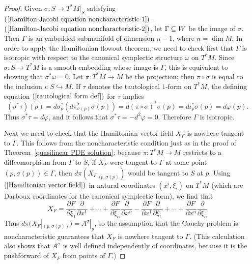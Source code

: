 \begin{proof}
Given $\sigma:S\to T^*M|_S$ satisfying $(\ref{Hamilton-Jacobi equation noncharacteristic-1})$--$(\ref{Hamilton-Jacobi equation noncharacteristic-2})$, let $\Gamma\subseteq W$ be the image of $\sigma$. Then $\Gamma$ is an embedded submanifold of dimension $n-1$, where $n=\dim M$. In order to apply the Hamiltonian flowout theorem, we need to check first that $\Gamma$ is isotropic with respect to the canonical symplectic structure $\omega$ on $T^*M$. Since $\sigma:S\to T^*M$ is a smooth embedding whose image is $\Gamma$, this is equivalent to showing that $\sigma^*\omega=0$. Let $\pi:T^*M\to M$ be the projection; then $\pi\circ\sigma$ is equal to the inclusion $\iota:S\hookrightarrow M$. If $\tau$ denotes the tautological $1$-form on $T^*M$, the defining equation $(\ref{tautological form def})$ for $\tau$ implies
\[(\sigma^*\tau)(p)=d\sigma_p^*(d\pi_{\sigma(p)}^*\sigma(p))=d(\pi\circ\sigma)^*\sigma(p)=d\iota_p^*\sigma(p)=d\varphi(p).\]
Thus $\sigma^*\tau=d\varphi$, and it follows that $\sigma^*\tau=-d^2\varphi=0$. Therefore $\Gamma$ is isotropic.\par
Next we need to check that the Hamiltonian vector field $X_F$ is nowhere tangent to $\Gamma$. This follows from the noncharacteristic condition just as in the proof of Theorem~\ref{quasilinear PDE solution}: because $\pi:T^*M\to M$ restricts to a diffeomorphism from $\Gamma$ to $S$, if $X_F$ were tangent to $\Gamma$ at some point $(p,\sigma(p))\in\Gamma$, then $d\pi(X_F|_{(p,\sigma(p)})$ would be tangent to $S$ at $p$. Using $(\ref{Hamiltonian vector field})$ in natural coordinates $(x^i,\xi_i)$ on $T^*M$ (which are Darboux coordinates for the canonical symplectic form), we find that
\[X_F=\frac{\partial F}{\partial\xi_1}\frac{\partial}{\partial x^1}+\cdots+\frac{\partial F}{\partial\xi_n}\frac{\partial}{\partial x^n}-\frac{\partial F}{\partial x^1}\frac{\partial}{\partial \xi_1}+\cdots+\frac{\partial F}{\partial x^n}\frac{\partial}{\partial\xi_n}\]
Thus $d\pi(X_F|_{(p,\sigma(p))})=A^\sigma|_p$, so the assumption that the Cauchy problem is noncharacteristic guarantees that $X_F$ is nowhere tangent to $\Gamma$. (This calculation also shows that $A^\sigma$ is well defined independently of coordinates, because it is the pushforward of $X_F$ from points of $\Gamma$.)\par

\end{proof}

